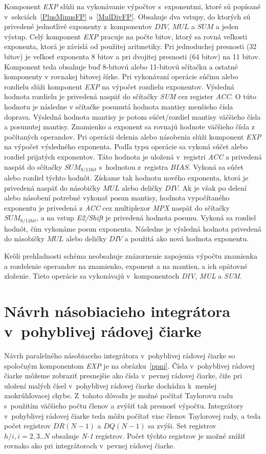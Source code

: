 Komponent \textit{EXP} slúži na vykonávanie výpočtov s~exponentmi, ktoré sú popísané v~sekciách~\ref{PlusMinusFP} a~\ref{MulDivFP}. Obsahuje dva vstupy, do ktorých sú privedené jednotlivé exponenty z~komponentov $ DIV $, $ MUL $ a $ SUM $ a jeden výstup. Celý komponent \textit{EXP} pracuje na počte bitov, ktorý sa rovná veľkosti exponenta, ktorá je závislá od použitej aritmetiky. Pri jednoduchej presnosti (32 bitov) je veľkosť exponenta 8 bitov a pri dvojitej presnosti (64 bitov) na 11 bitov. Komponent teda obsahuje buď 8-bitovú alebo 11-bitovú sčítačku a ostatné komponenty v rovnakej bitovej šírke.
Pri vykonávaní operácie súčinu alebo rozdielu slúži komponent \textit{EXP} na výpočet rozdielu exponentov. Výsledná hodnota rozdielu je privedená naspäť do sčítačky \textit{SUM} cez register \textit{ACC}. O túto hodnotu je následne v sčítačke posunutá hodnota mantisy menšieho čísla doprava. Výsledná hodnota mantisy je potom súčet/rozdiel mantisy väčšieho čísla a posunutej mantisy. Znamienko a exponent sa rovnajú hodnote väčšieho čísla z počítaných operandov.
Pri operácii delenia alebo násobenia slúži komponent \textit{EXP} na výpočet výsledného exponenta. Podľa typu operácie sa vykoná súčet alebo rozdiel prijatých exponentov. Táto hodnota je uložená v~registri \textit{ACC} a privedená naspäť do sčítačky $ SUM_{8/11bit} $ s~hodnotou z~registra $ BIAS $. Vykoná sa súčet alebo rozdiel týchto hodnôt. Získame tak hodnotu nového exponenta, ktorá je privedená naspäť do násobičky $ MUL $ alebo deličky $ DIV $. Ak je však po delení alebo násobení potrebné vykonať posun mantisy, hodnota vypočítaného exponentu je privedená z \textit{ACC} cez multiplexor \textit{MPX} naspäť do sčítačky  $ SUM_{8/11bit} $, a na vstup \textit{E2/Shift} je privedená hodnota posunu. Vykoná sa rozdiel hodnôt, čím vykonáme posun exponenta. Následne je výsledná hodnota privedená do násobičky $ MUL $ alebo deličky $ DIV $ a použitá ako nová hodnota exponentu.

Kvôli prehľadnosti schéma neobsahuje znázornenie zapojenia výpočtu znamienka a rozdelenie operandov na znamienko, exponent a na mantisu, a ich opätovné zloženie. Tieto operácie sa vykonávajú v~komponentoch \textit{DIV}, \textit{MUL} a \textit{SUM}.\\

\section{Návrh násobiacieho integrátora v~pohyblivej rádovej čiarke}
Návrh paralelného násobiaceho integrátora v~pohyblivej rádovej čiarke so spoločným komponentom \textit{EXP} je na obrázku~\ref{ppni}. Čísla v~pohyblivej rádovej čiarke môžeme zobraziť presnejšie ako čísla v~pevnej rádovej čiarke, čiže pri uložení malých čísel v~pohyblivej rádovej čiarke dochádza k~menšej zaokrúhľovacej chybe. Z~tohoto dôvodu je možné počítať Taylorovu radu s~použitím väčšieho počtu členov a zvýšiť tak presnosť výpočtu. Integrátory v~pohyblivej rádovej čiarke teda môžu počítať viac členov Taylorovej rady, a teda počet registrov $ DR(N-1) $ a $ DQ(N-1) $ sa zvýši. Set registrov $ h/i, i=2,3..N $ obsahuje \textit{N-1} registrov. Počet týchto registrov je možné znížiť rovnako ako pri integrátoroch v~pevnej rádovej čiarke.


